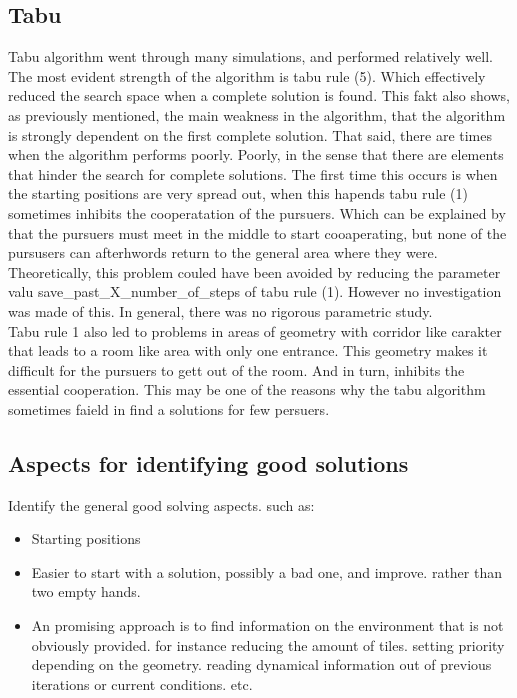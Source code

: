\subsection{Tabu}
Tabu algorithm went through many simulations, and performed relatively well.
The most evident strength of the algorithm is tabu rule (5). Which effectively reduced the search space when a complete solution is found. This fakt also shows, as previously mentioned, the main weakness in the algorithm, that the algorithm is strongly dependent on the first complete solution.
That said, there are times when the algorithm performs poorly. Poorly, in the sense that there are elements that hinder the search for complete solutions.
The first time this occurs is when the starting positions are very spread out, when this hapends tabu rule (1) sometimes inhibits the cooperatation of the pursuers. Which can be explained by that the pursuers must meet in the middle to start cooaperating, but none of the pursusers can afterhwords  return to the general area where they were. Theoretically, this problem couled have been avoided by reducing  the parameter valu save\_past\_X\_number\_of\_steps  of tabu rule (1). However no investigation was made of this. In general, there was no rigorous parametric study.\\
Tabu rule 1 also led to problems in areas of geometry with corridor like carakter  that leads to a room like area with only one entrance. This geometry makes it difficult for  the pursuers to gett out of the room. And in turn, inhibits the essential cooperation. This may be one of the reasons why the tabu algorithm sometimes faield in find a solutions for few persuers.

\subsection{Aspects for identifying good solutions}
Identify the general good solving aspects. such as:\\
\begin{itemize}
\item Starting positions
\item Easier to start with a solution, possibly a bad one, and improve. rather than two empty hands.
\item An promising approach is to find information on the environment that is not obviously provided. for instance reducing the amount of tiles. setting priority depending on the geometry. reading dynamical information out of previous iterations or current conditions. etc.
\end{itemize}

